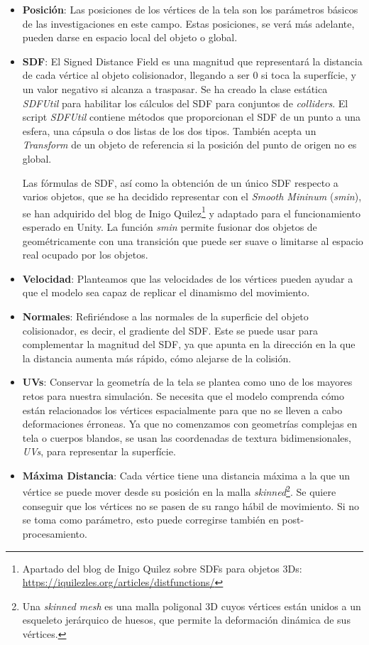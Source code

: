 \begin{itemize}
    \item \textbf{Posición}: Las posiciones de los vértices de la tela son los parámetros básicos de las investigaciones en este campo. Estas posiciones, se verá más adelante, pueden darse en espacio local del objeto o global.
    \item \textbf{SDF}: El Signed Distance Field es una magnitud que representará la distancia de cada vértice al objeto colisionador, llegando a ser 0 si toca la superfície, y un valor negativo si alcanza a traspasar. Se ha creado la clase estática \textit{SDFUtil} para habilitar los cálculos del SDF para conjuntos de \textit{colliders}. El script \textit{SDFUtil} contiene métodos que proporcionan el SDF de un punto a una esfera, una cápsula o dos listas de los dos tipos. También acepta un \textit{Transform} de un objeto de referencia si la posición del punto de origen no es global.

    Las fórmulas de SDF, así como la obtención de un único SDF respecto a varios objetos, que se ha decidido representar con el \textit{Smooth Mininum} (\textit{smin}), se han adquirido del blog de Inigo Quilez\footnote{Apartado del blog de Inigo Quilez sobre SDFs para objetos 3Ds: \url{https://iquilezles.org/articles/distfunctions/}} y adaptado para el funcionamiento esperado en Unity. La función \textit{smin} permite fusionar dos objetos de geométricamente con una transición que puede ser suave o limitarse al espacio real ocupado por los objetos.

    \item \textbf{Velocidad}: Planteamos que las velocidades de los vértices pueden ayudar a que el modelo sea capaz de replicar el dinamismo del movimiento. 
    \item \textbf{Normales}: Refiriéndose a las normales de la superficie del objeto colisionador, es decir, el gradiente del SDF. Este se puede usar para complementar la magnitud del SDF, ya que apunta en la dirección en la que la distancia aumenta más rápido, cómo alejarse de la colisión.
    \item \textbf{UVs}: Conservar la geometría de la tela se plantea como uno de los mayores retos para nuestra simulación. Se necesita que el modelo comprenda cómo están relacionados los vértices espacialmente para que no se lleven a cabo deformaciones érroneas. Ya que no comenzamos con geometrías complejas en tela o cuerpos blandos, se usan las coordenadas de textura bidimensionales, \textit{UVs}, para representar la superfície.
    \item \textbf{Máxima Distancia}: Cada vértice tiene una distancia máxima a la que un vértice se puede mover desde su posición en la malla \textit{skinned}\footnote{Una \textit{skinned mesh} es una malla poligonal 3D cuyos vértices están unidos a un esqueleto jerárquico de huesos, que permite la deformación dinámica de sus vértices.}. Se quiere conseguir que los vértices no se pasen de su rango hábil de movimiento. Si no se toma como parámetro, esto puede corregirse también en post-procesamiento.
\end{itemize}

